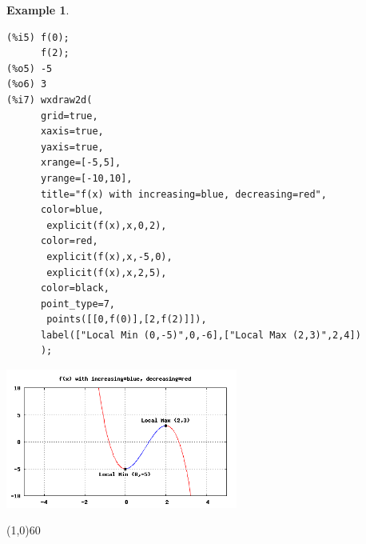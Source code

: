 \documentclass[10.5pt,twoside]{report}
\theoremstyle{definition}
\newtheorem{exmp}{Example}[section]
\begin{document}
\begin{exmp}
\begin{verbatim}
(%i5) f(0);
      f(2);
(%o5) -5
(%o6) 3
(%i7) wxdraw2d(
      grid=true,
      xaxis=true,
      yaxis=true,
      xrange=[-5,5],
      yrange=[-10,10],
      title="f(x) with increasing=blue, decreasing=red",
      color=blue,
       explicit(f(x),x,0,2),
      color=red,
       explicit(f(x),x,-5,0),
       explicit(f(x),x,2,5),
      color=black,
      point_type=7,
       points([[0,f(0)],[2,f(2)]]),
      label(["Local Min (0,-5)",0,-6],["Local Max (2,3)",2,4])
      );
\end{verbatim}

\includegraphics[width=3in]{example_5_1_1_2}


\end{exmp}

\line(1,0){60}
\linethickness{0.5mm}
\end{document}
